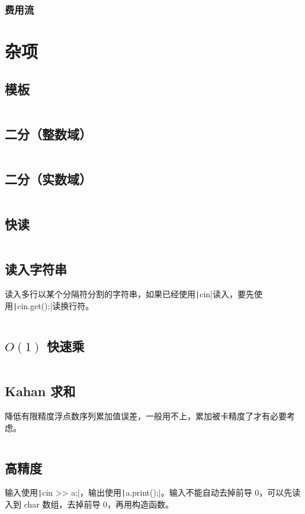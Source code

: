 \documentclass[a4paper, twoside]{article}
\begin{document}
    \subsubsection{费用流}


\newpage
\section{杂项}
\subsection{模板}
\inputminted{cpp}{../src/杂项/模板.cpp}

\subsection{二分（整数域）}
\inputminted{cpp}{../src/杂项/二分（整数域）.cpp}

\subsection{二分（实数域）}
\inputminted{cpp}{../src/杂项/二分（实数域）.cpp}

\subsection{快读}
\inputminted{cpp}{../src/杂项/快读.cpp}

\subsection{读入字符串}
读入多行以某个分隔符分割的字符串，如果已经使用\texttt|cin|读入，要先使用\texttt|cin.get();|读换行符。
\inputminted{cpp}{../src/杂项/读入字符串.cpp}

\subsection{$O(1)$ 快速乘}
\inputminted{cpp}{../src/杂项/O(1)快速乘.cpp}

\subsection{Kahan 求和}
降低有限精度浮点数序列累加值误差，一般用不上，累加被卡精度了才有必要考虑。
\inputminted{cpp}{../src/杂项/Kahan求和.cpp}

\subsection{高精度}
输入使用\texttt|cin >> a;|，输出使用\texttt|a.print();|。输入不能自动去掉前导 0，可以先读入到 char 数组，去掉前导 0，再用构造函数。
\inputminted{cpp}{../src/杂项/高精度.cpp}
\end{document}
